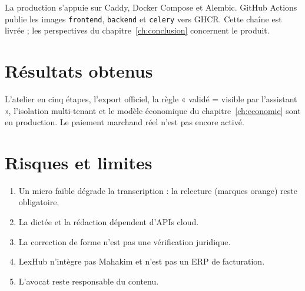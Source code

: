 La production s'appuie sur Caddy, Docker Compose et Alembic. GitHub Actions publie les images \texttt{frontend}, \texttt{backend} et \texttt{celery} vers GHCR. Cette chaîne est livrée ; les perspectives du chapitre~\ref{ch:conclusion} concernent le produit.

\section{Résultats obtenus}

L'atelier en cinq étapes, l'export officiel, la règle « validé = visible par l'assistant », l'isolation multi-tenant et le modèle économique du chapitre~\ref{ch:economie} sont en production. Le paiement marchand réel n'est pas encore activé.

\section{Risques et limites}
\label{sec:limites}

\begin{enumerate}[leftmargin=1.4em]
  \item Un micro faible dégrade la transcription : la relecture (marques orange) reste obligatoire.
  \item La dictée et la rédaction dépendent d'APIs cloud.
  \item La correction de forme n'est pas une vérification juridique.
  \item LexHub n'intègre pas Mahakim et n'est pas un ERP de facturation.
  \item L'avocat reste responsable du contenu.
\end{enumerate}
